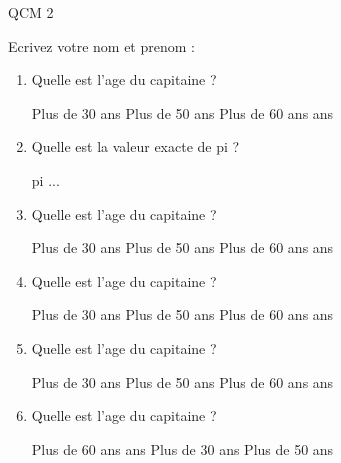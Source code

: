 \documentclass[a4paper, 11pt]{article}
\begin{document}
	QCM 2
	
	Ecrivez votre nom et prenom :
	\begin{qcm}
		\begin{enumerate}
			\item Quelle est l'age du capitaine ?
			\begin{tabenum} [1)]
				\tabenumitem Plus de 30 ans
				\tabenumitem Plus de 50 ans
				\tabenumitem Plus de 60 ans
				 ans
			\end{tabenum}
		\vspace{5mm}

			\item Quelle est la valeur exacte de pi ?
			\begin{tabenum} [1)]
				\tabenumitem pi
				...
			\end{tabenum}
		\vspace{5mm}

			\item Quelle est l'age du capitaine ?
			\begin{tabenum} [1)]
				\tabenumitem Plus de 30 ans
				\tabenumitem Plus de 50 ans
				\tabenumitem Plus de 60 ans
				 ans
			\end{tabenum}
		\vspace{5mm}

			\item Quelle est l'age du capitaine ?
			\begin{tabenum} [1)]
				\tabenumitem Plus de 30 ans
				\tabenumitem Plus de 50 ans
				\tabenumitem Plus de 60 ans
				 ans
			\end{tabenum}
		\vspace{5mm}

			\item Quelle est l'age du capitaine ?
			\begin{tabenum} [1)]
				\tabenumitem Plus de 30 ans
				\tabenumitem Plus de 50 ans
				\tabenumitem Plus de 60 ans
				 ans
			\end{tabenum}
		\vspace{5mm}

			\item Quelle est l'age du capitaine ?
			\begin{tabenum} [1)]
				\tabenumitem Plus de 60 ans
				 ans
				\tabenumitem Plus de 30 ans
				\tabenumitem Plus de 50 ans
			\end{tabenum}
		\vspace{5mm}

		\end{enumerate}
	\end{qcm}
	\newpage
	
\end{document}
